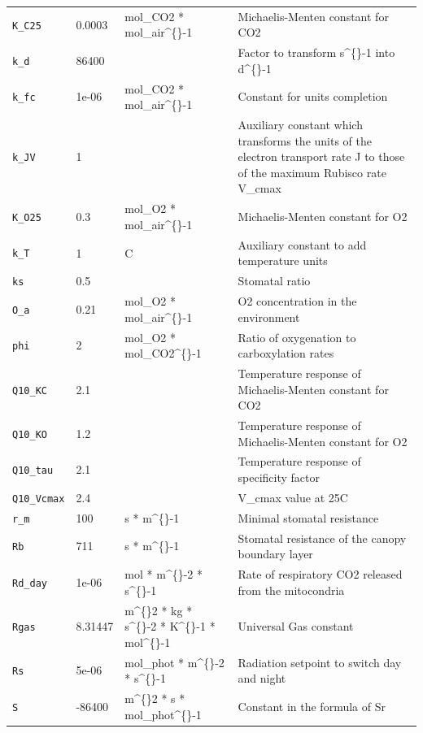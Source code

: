 \documentclass[11pt,a4paper]{article}
\begin{document}
\begin{longtable}{@{}p{} p{} p{} p{}@{}}
\texttt{K\_C25} & 0.0003 & mol\_CO2 * mol\_air\textasciicircum\{\}-1 & Michaelis-Menten constant for CO2\\
\texttt{k\_d} & 86400 &  & Factor to transform s\textasciicircum\{\}-1 into d\textasciicircum\{\}-1\\
\texttt{k\_fc} & 1e-06 & mol\_CO2 * mol\_air\textasciicircum\{\}-1 & Constant for units completion\\
\texttt{k\_JV} & 1 &  & Auxiliary constant which transforms the units of the electron transport rate J to those of the maximum Rubisco rate V\_cmax\\
\texttt{K\_O25} & 0.3 & mol\_O2 * mol\_air\textasciicircum\{\}-1 & Michaelis-Menten constant for O2\\
\texttt{k\_T} & 1 & C & Auxiliary constant to add temperature units\\
\texttt{ks} & 0.5 &  & Stomatal ratio\\
\texttt{O\_a} & 0.21 & mol\_O2 * mol\_air\textasciicircum\{\}-1 & O2 concentration in the environment\\
\texttt{phi} & 2 & mol\_O2 * mol\_CO2\textasciicircum\{\}-1 & Ratio of oxygenation to carboxylation rates\\
\texttt{Q10\_KC} & 2.1 &  & Temperature response of Michaelis-Menten constant for CO2\\
\texttt{Q10\_KO} & 1.2 &  & Temperature response of Michaelis-Menten constant for O2\\
\texttt{Q10\_tau} & 2.1 &  & Temperature response of specificity factor\\
\texttt{Q10\_Vcmax} & 2.4 &  & V\_cmax value at 25C\\
\texttt{r\_m} & 100 & s * m\textasciicircum\{\}-1 & Minimal stomatal resistance\\
\texttt{Rb} & 711 & s * m\textasciicircum\{\}-1 & Stomatal resistance of the canopy boundary layer\\
\texttt{Rd\_day} & 1e-06 & mol * m\textasciicircum\{\}-2 * s\textasciicircum\{\}-1 & Rate of respiratory CO2 released from the mitocondria\\
\texttt{Rgas} & 8.31447 & m\textasciicircum\{\}2 * kg * s\textasciicircum\{\}-2 * K\textasciicircum\{\}-1 * mol\textasciicircum\{\}-1 & Universal Gas constant\\
\texttt{Rs} & 5e-06 & mol\_phot * m\textasciicircum\{\}-2 * s\textasciicircum\{\}-1 & Radiation setpoint to switch day and night\\
\texttt{S} & -86400 & m\textasciicircum\{\}2 * s * mol\_phot\textasciicircum\{\}-1 & Constant in the formula of Sr\\

\end{longtable}
\end{document}
